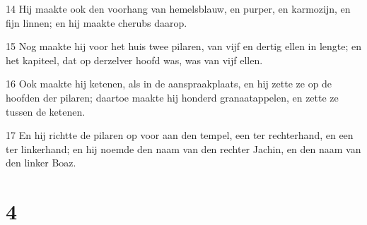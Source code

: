 \par 14 Hij maakte ook den voorhang van hemelsblauw, en purper, en karmozijn, en fijn linnen; en hij maakte cherubs daarop.
\par 15 Nog maakte hij voor het huis twee pilaren, van vijf en dertig ellen in lengte; en het kapiteel, dat op derzelver hoofd was, was van vijf ellen.
\par 16 Ook maakte hij ketenen, als in de aanspraakplaats, en hij zette ze op de hoofden der pilaren; daartoe maakte hij honderd granaatappelen, en zette ze tussen de ketenen.
\par 17 En hij richtte de pilaren op voor aan den tempel, een ter rechterhand, en een ter linkerhand; en hij noemde den naam van den rechter Jachin, en den naam van den linker Boaz.

\chapter{4}

